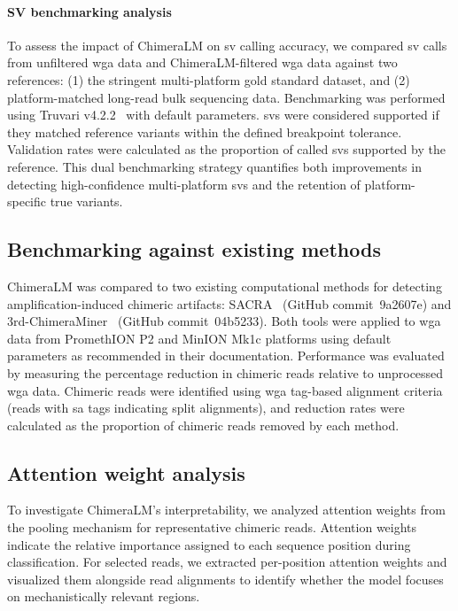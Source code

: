 \documentclass[pdflatex,sn-nature,lineno]{sn-jnl}%
\theoremstyle{thmstyleone}%
\theoremstyle{thmstyletwo}%
\theoremstyle{thmstylethree}%
\begin{document}
\paragraph{SV benchmarking analysis}
To assess the impact of ChimeraLM on \gls{sv} calling accuracy, we compared \gls{sv} calls from unfiltered \gls{wga} data and ChimeraLM-filtered \gls{wga} data against two references: (1) the stringent multi-platform gold standard dataset, and (2) platform-matched long-read bulk sequencing data.
Benchmarking was performed using Truvari v4.2.2~\cite{english2022truvari} with default parameters.
\glspl{sv} were considered supported if they matched reference variants within the defined breakpoint tolerance.
Validation rates were calculated as the proportion of called \glspl{sv} supported by the reference.
This dual benchmarking strategy quantifies both improvements in detecting high-confidence multi-platform \glspl{sv} and the retention of platform-specific true variants.

\subsection*{Benchmarking against existing methods}
ChimeraLM was compared to two existing computational methods for detecting amplification-induced chimeric artifacts: SACRA~\cite{kiguchi2021longread} (GitHub commit~9a2607e) and 3rd-ChimeraMiner~\cite{lu2023exploration} (GitHub commit~04b5233).
Both tools were applied to \gls{wga} data from PromethION P2 and MinION Mk1c platforms using default parameters as recommended in their documentation.
Performance was evaluated by measuring the percentage reduction in chimeric reads relative to unprocessed \gls{wga} data.
Chimeric reads were identified using \gls{wga} tag-based alignment criteria (reads with \gls{sa} tags indicating split alignments), and reduction rates were calculated as the proportion of chimeric reads removed by each method.


\subsection*{Attention weight analysis}

To investigate ChimeraLM's interpretability, we analyzed attention weights from the pooling mechanism for representative chimeric reads.
Attention weights indicate the relative importance assigned to each sequence position during classification.
For selected reads, we extracted per-position attention weights and visualized them alongside read alignments to identify whether the model focuses on mechanistically relevant regions.
\end{document}
